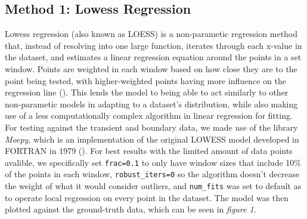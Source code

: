 \documentclass[letterpaper,12pt]{article}
\begin{document}
\subsection{Method 1: Lowess Regression}
Lowess regression (also known as LOESS) is a non-parametic regression method that, instead 
of resolving into one large function, iterates through each x-value in the dataset, and 
estimates a linear regression equation around the points in a set window. Points are 
weighted in each window based on how close they are to the point being tested, with 
higher-weighted points having more influence on the regression line (\cite{Figueira_2021}). 
This lends the model to being able to act similarly to other non-parametic models in adapting
to a dataset's distribution, while also making use of a less computationally complex algorithm
in linear regression for fitting. For testing against the transient and boundary data, we
made use of the library \emph{Moepy}, which is an implementation of the original LOWESS model 
developed in FORTRAN in 1979 (\cite{ayrton_bourn_2021_4812979}). For best results with the
limited amount of data points avalible, we specifically set \verb|frac=0.1| to only have window
sizes that include 10\% of the points in each window, \verb|robust_iters=0| so the algorithm
doesn't decrease the weight of what it would consider outliers, and \verb|num_fits| was set
to default as to operate local regression on every point in the dataset. The model was
then plotted against the ground-truth data, which can be seen in \emph{figure 1}. 
\end{document}
